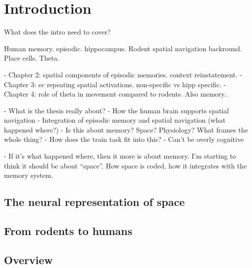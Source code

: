 \chapter{Introduction}



What does the intro need to cover?

Human memory. episodic. hippocampus.
Rodent spatial navigation backround. Place cells. Theta.



- Chapter 2: spatial components of episodic memories. context reinstatement.
- Chapter 3: ec repeating spatial activations. non-specific vs hipp specific.
- Chapter 4: role of theta in movement compared to rodents. Also memory..


- What is the thesis really about?
- How the human brain supports spatial navigation
- Integration of episodic memory and spatial navigation (what happened where?)
- Is this about memory? Space? Physiology? What frames the whole thing?
- How does the train task fit into this?
- Can't be overly cognitive

- If it's what happened where, then it more is about memory. I'm starting to think it should be about ``space''. How space is coded, how it integrates with the memory system.





\section{The neural representation of space}
\section{From rodents to humans}
\section{Overview}

